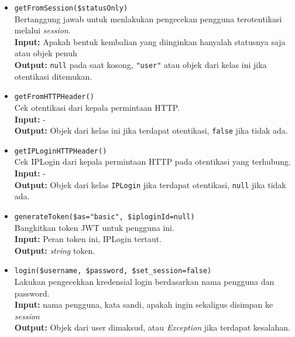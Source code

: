 \begin{itemize}
\begin{itemize}
                \item \texttt{getFromSession(\$statusOnly)} \\
                    Bertanggung jawab untuk menlakukan pengecekan pengguna terotentikasi melalui 
                    \textit{session}. \\
                    \textbf{Input:} Apakah bentuk kembalian yang diinginkan hanyalah statusnya saja atau objek 
                        penuh\\
                    \textbf{Output:} \texttt{null} pada saat kosong, \texttt{"user"} atau objek
                        dari kelas ini jika otentikasi ditemukan.
                
                \item \texttt{getFromHTTPHeader()} \\
                    Cek otentikasi dari kepala permintaan HTTP. \\
                    \textbf{Input:} - \\
                    \textbf{Output:} Objek dari kelas ini jika terdapat otentikasi, \texttt{false} jika
                        tidak ada.
                
                \item \texttt{getIPLoginHTTPHeader()} \\
                    Cek IPLogin dari kepala permintaan HTTP pada otentikasi yang terhubung. \\
                    \textbf{Input:} -\\
                    \textbf{Output:} Objek dari kelas \texttt{IPLogin} jika terdapat otentikasi, 
                        \texttt{null} jika tidak ada.
                
                \item \texttt{generateToken(\$as="basic", \$iploginId=null)} \\
                    Bangkitkan token JWT untuk pengguna ini. \\
                    \textbf{Input:} Peran token ini, IPLogin tertaut.\\
                    \textbf{Output:} \textit{string} token.
                
                \item \texttt{login(\$username, \$password, \$set\_session=false)} \\
                    Lakukan pengecekkan kredensial login berdasarkan nama pengguna dan password. \\
                    \textbf{Input:} nama pengguna, kata sandi, apakah ingin sekaligus disimpan ke
                        \textit{session}\\
                    \textbf{Output:} Objek dari user dimaksud, atau \textit{Exception} jika terdapat
                        kesalahan.
                

\end{itemize}
\end{itemize}
